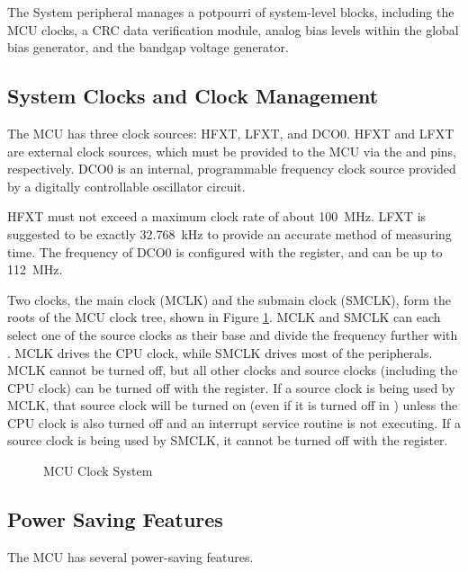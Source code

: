 The System peripheral manages a potpourri of system-level blocks, including the MCU clocks, a CRC data verification module, analog bias levels within the global bias generator, and the bandgap voltage generator.

\subsection{System Clocks and Clock Management} \label{ss:clocks}
The MCU has three clock sources: HFXT, LFXT, and DCO0. HFXT and LFXT are external clock sources, which must be provided to the MCU via the  and  pins, respectively. DCO0 is an internal, programmable frequency clock source provided by a digitally controllable oscillator circuit.

HFXT must not exceed a maximum clock rate of about 100~\si{\mega\hertz}. LFXT is suggested to be exactly 32.768~\si{\kilo\hertz} to provide an accurate method of measuring time. The frequency of DCO0 is configured with the  register, and can be up to 112~\si{\mega\hertz}.

Two clocks, the main clock (MCLK) and the submain clock (SMCLK), form the roots of the MCU clock tree, shown in Figure \ref{fig:mcu-clock-system}. MCLK and SMCLK can each select one of the source clocks as their base and divide the frequency further with . MCLK drives the CPU clock, while SMCLK drives most of the peripherals. MCLK cannot be turned off, but all other clocks and source clocks (including the CPU clock) can be turned off with the  register. If a source clock is being used by MCLK, that source clock will be turned on (even if it is turned off in ) unless the CPU clock is also turned off and an interrupt service routine is not executing. If a source clock is being used by SMCLK, it cannot be turned off with the  register.

\begin{figure}[htpb]

\caption{MCU Clock System}
\label{fig:mcu-clock-system}
\end{figure}



\subsection{Power Saving Features} \label{ss:power-saving}
The MCU has several power-saving features.

